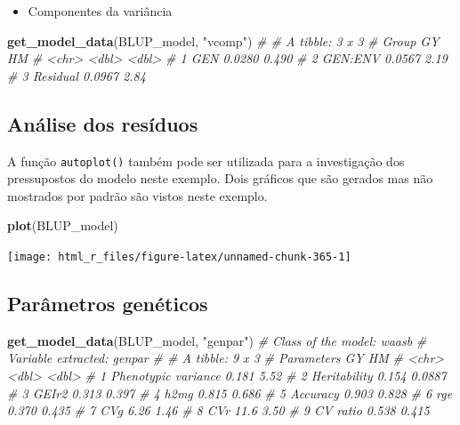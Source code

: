\documentclass[
]{book}
\newenvironment{Shaded}{\begin{snugshade}}{\end{snugshade}}
\newcommand{\CommentTok}[1]{\textcolor[rgb]{0.56,0.35,0.01}{\textit{#1}}}
\newcommand{\KeywordTok}[1]{\textcolor[rgb]{0.13,0.29,0.53}{\textbf{#1}}}
\newcommand{\NormalTok}[1]{#1}
\newcommand{\StringTok}[1]{\textcolor[rgb]{0.31,0.60,0.02}{#1}}
\providecommand{\tightlist}{%
  \setlength{\itemsep}{0pt}\setlength{\parskip}{0pt}}
\begin{document}
\begin{itemize}
\tightlist
\item
  Componentes da variância
\end{itemize}

\begin{Shaded}
\begin{Highlighting}[]
\KeywordTok{get_model_data}\NormalTok{(BLUP_model, }\StringTok{"vcomp"}\NormalTok{)}
\CommentTok{# # A tibble: 3 x 3}
\CommentTok{#   Group        GY    HM}
\CommentTok{#   <chr>     <dbl> <dbl>}
\CommentTok{# 1 GEN      0.0280 0.490}
\CommentTok{# 2 GEN:ENV  0.0567 2.19 }
\CommentTok{# 3 Residual 0.0967 2.84}
\end{Highlighting}
\end{Shaded}

\hypertarget{anuxe1lise-dos-resuxedduos}{%
\subsection{Análise dos resíduos}\label{anuxe1lise-dos-resuxedduos}}

A função \texttt{autoplot()} também pode ser utilizada para a investigação dos pressupostos do modelo neste exemplo. Dois gráficos que são gerados mas não mostrados por padrão são vistos neste exemplo.

\begin{Shaded}
\begin{Highlighting}[]
\KeywordTok{plot}\NormalTok{(BLUP_model)}
\end{Highlighting}
\end{Shaded}

\begin{center}\texttt{[image: html\_r\_files/figure-latex/unnamed-chunk-365-1]} \end{center}

\hypertarget{paruxe2metros-genuxe9ticos}{%
\subsection{Parâmetros genéticos}\label{paruxe2metros-genuxe9ticos}}

\begin{Shaded}
\begin{Highlighting}[]
\KeywordTok{get_model_data}\NormalTok{(BLUP_model, }\StringTok{"genpar"}\NormalTok{)}
\CommentTok{# Class of the model: waasb}
\CommentTok{# Variable extracted: genpar}
\CommentTok{# # A tibble: 9 x 3}
\CommentTok{#   Parameters              GY     HM}
\CommentTok{#   <chr>                <dbl>  <dbl>}
\CommentTok{# 1 Phenotypic variance  0.181 5.52  }
\CommentTok{# 2 Heritability         0.154 0.0887}
\CommentTok{# 3 GEIr2                0.313 0.397 }
\CommentTok{# 4 h2mg                 0.815 0.686 }
\CommentTok{# 5 Accuracy             0.903 0.828 }
\CommentTok{# 6 rge                  0.370 0.435 }
\CommentTok{# 7 CVg                  6.26  1.46  }
\CommentTok{# 8 CVr                 11.6   3.50  }
\CommentTok{# 9 CV ratio             0.538 0.415}
\end{Highlighting}
\end{Shaded}
\end{document}
